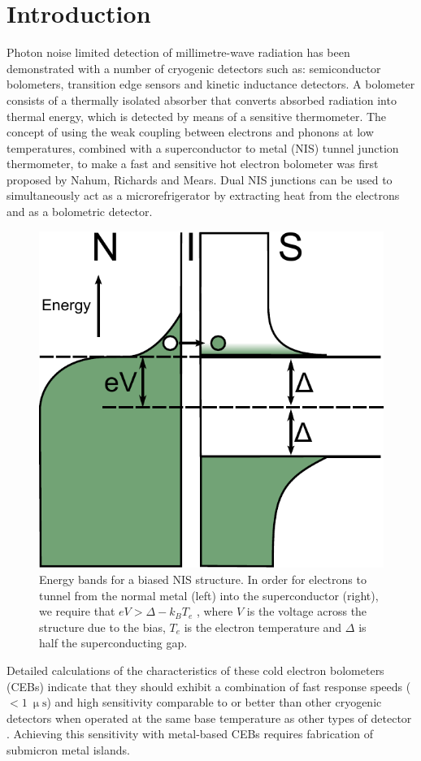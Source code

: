 \documentclass[aip, apl, a4paper, amsmath,amssymb, reprint]{revtex4-1}
\begin{document}
\section{Introduction} \label{sec:Introduction}
Photon noise limited detection of millimetre-wave radiation has been demonstrated with a number of cryogenic detectors such as: semiconductor bolometers, transition edge sensors and kinetic inductance detectors\cite{Morozov11,Doyle08}. A bolometer consists of a thermally isolated absorber that converts absorbed radiation into thermal energy, which is detected by means of a sensitive thermometer. The concept of using the weak coupling between electrons and phonons at low temperatures, combined with a superconductor to metal (NIS) tunnel junction thermometer, to make a fast and sensitive hot electron bolometer was first proposed by Nahum, Richards and Mears\cite{Nahum93, Nahum94}. Dual NIS junctions can be used to simultaneously act as a microrefrigerator by extracting heat from the electrons and as a bolometric detector.
\begin{figure}[ht]
\includegraphics[width = 0.5\columnwidth]{NIS_energyLevels_Bias}
\caption{Energy bands for a biased NIS structure. In order for electrons to tunnel from the normal metal (left) into the superconductor (right), we require that  $eV > \Delta - k_{B}T_{e}$ , where $V$  is the voltage across the structure due to the bias, $T_{e}$ is the electron temperature and $\Delta $ is half the superconducting gap.}
\label{fig:NISenergy}
\end{figure}

Detailed calculations of the characteristics of these cold electron bolometers (CEBs) indicate that they should exhibit a combination of fast response speeds ($<1~\mathrm{\upmu s}$) and high sensitivity comparable to or better than other cryogenic detectors when operated at the same base temperature as other types of detector \cite{Kuzmin98, Golubev01, Kuzmin04, Kuzmin06}. Achieving this sensitivity with metal-based CEBs requires fabrication of submicron metal islands. 
\end{document}
